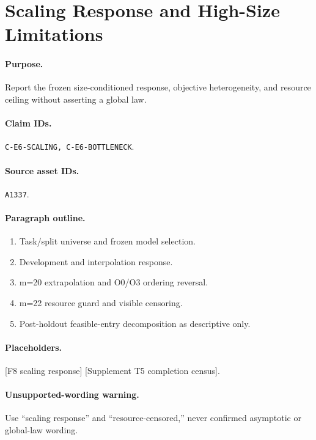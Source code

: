 \section{Scaling Response and High-Size Limitations}

\paragraph{Purpose.}
Report the frozen size-conditioned response, objective heterogeneity, and
resource ceiling without asserting a global law.

\paragraph{Claim IDs.}
\texttt{C-E6-SCALING, C-E6-BOTTLENECK}.

\paragraph{Source asset IDs.}
\texttt{A1337}.

\paragraph{Paragraph outline.}
\begin{enumerate}
  \item Task/split universe and frozen model selection.
  \item Development and interpolation response.
  \item m=20 extrapolation and O0/O3 ordering reversal.
  \item m=22 resource guard and visible censoring.
  \item Post-holdout feasible-entry decomposition as descriptive only.
\end{enumerate}

\paragraph{Placeholders.}
[F8 scaling response] [Supplement T5 completion census].

\paragraph{Unsupported-wording warning.}
Use ``scaling response'' and ``resource-censored,'' never confirmed asymptotic or
global-law wording.
